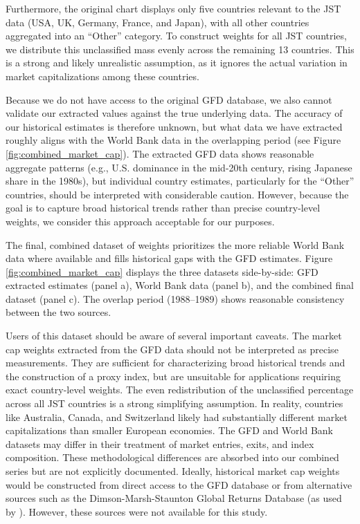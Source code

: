 \documentclass[11pt]{article}
\begin{document}
Furthermore, the original chart displays only five countries relevant to the JST data (USA, UK, Germany, France, and Japan), with all other countries aggregated into an ``Other'' category. To construct weights for all JST countries, we distribute this unclassified mass evenly across the remaining 13 countries. This is a strong and likely unrealistic assumption, as it ignores the actual variation in market capitalizations among these countries. 

Because we do not have access to the original GFD database, we also cannot validate our extracted values against the true underlying data. The accuracy of our historical estimates is therefore unknown, but what data we have extracted roughly aligns with the World Bank data in the overlapping period (see Figure \ref{fig:combined_market_cap}). The extracted GFD data shows reasonable aggregate patterns (e.g., U.S. dominance in the mid-20th century, rising Japanese share in the 1980s), but individual country estimates, particularly for the ``Other'' countries, should be interpreted with considerable caution. However, because the goal is to capture broad historical trends rather than precise country-level weights, we consider this approach acceptable for our purposes.

The final, combined dataset of weights prioritizes the more reliable World Bank data where available and fills historical gaps with the GFD estimates. Figure \ref{fig:combined_market_cap} displays the three datasets side-by-side: GFD extracted estimates (panel a), World Bank data (panel b), and the combined final dataset (panel c). The overlap period (1988--1989) shows reasonable consistency between the two sources.

Users of this dataset should be aware of several important caveats. The market cap weights extracted from the GFD data should not be interpreted as precise measurements. They are sufficient for characterizing broad historical trends and the construction of a proxy index, but are unsuitable for applications requiring exact country-level weights. The even redistribution of the unclassified percentage across all JST countries is a strong simplifying assumption. In reality, countries like Australia, Canada, and Switzerland likely had substantially different market capitalizations than smaller European economies. The GFD and World Bank datasets may differ in their treatment of market entries, exits, and index composition. These methodological differences are absorbed into our combined series but are not explicitly documented. Ideally, historical market cap weights would be constructed from direct access to the GFD database or from alternative sources such as the Dimson-Marsh-Staunton Global Returns Database (as used by \textcite{estrada2014glidepath,estrada2015retirement}). However, these sources were not available for this study.
\end{document}
